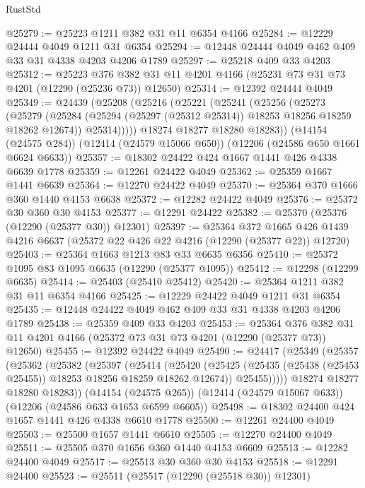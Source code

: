 \begin{lexlean}{RustStd}
\begin{coremodule}
{\begin{coremodule}
{{{{{{{{{{{{{{{{{{{{{{{{{{{{{{{{{{{{{{{{{{{{{{{{{{@25279 := @25223 @1211 @382 @31 @11 @6354 @4166
@25284 := @12229 @24444 @4049 @1211 @31 @6354
@25294 := @12448 @24444 @4049 @462 @409 @33 @31 @4338 @4203 @4206 @1789
@25297 := @25218 @409 @33 @4203
@25312 := @25223
    @376
    @382
    @31
    @11
    @4201
    @4166
    (@25231 @73 @31 @73 @4201 (@12290 (@25236 @73)) @12650)
@25314 := @12392 @24444 @4049
@25349 := @24439
    (@25208
      (@25216
        (@25221
          (@25241
            (@25256
              (@25273
                (@25279
                  (@25284 (@25294 (@25297 (@25312 @25314)) @18253 @18256 @18259 @18262 @12674))
                  @25314)))))
        @18274
        @18277
        @18280
        @18283))
    (@14154 (@24575 @284))
    (@12414 (@24579 @15066 @650))
    (@12206 (@24586 @650 @1661 @6624 @6633))
@25357 := @18302 @24422 @424 @1667 @1441 @426 @4338 @6639 @1778
@25359 := @12261 @24422 @4049
@25362 := @25359 @1667 @1441 @6639
@25364 := @12270 @24422 @4049
@25370 := @25364 @370 @1666 @360 @1440 @4153 @6638
@25372 := @12282 @24422 @4049
@25376 := @25372 @30 @360 @30 @4153
@25377 := @12291 @24422
@25382 := @25370 (@25376 (@12290 (@25377 @30)) @12301)
@25397 := @25364
    @372
    @1665
    @426
    @1439
    @4216
    @6637
    (@25372 @22 @426 @22 @4216 (@12290 (@25377 @22)) @12720)
@25403 := @25364 @1663 @1213 @83 @33 @6635 @6356
@25410 := @25372 @1095 @83 @1095 @6635 (@12290 (@25377 @1095))
@25412 := @12298 (@12299 @6635)
@25414 := @25403 (@25410 @25412)
@25420 := @25364 @1211 @382 @31 @11 @6354 @4166
@25425 := @12229 @24422 @4049 @1211 @31 @6354
@25435 := @12448 @24422 @4049 @462 @409 @33 @31 @4338 @4203 @4206 @1789
@25438 := @25359 @409 @33 @4203
@25453 := @25364
    @376
    @382
    @31
    @11
    @4201
    @4166
    (@25372 @73 @31 @73 @4201 (@12290 (@25377 @73)) @12650)
@25455 := @12392 @24422 @4049
@25490 := @24417
    (@25349
      (@25357
        (@25362
          (@25382
            (@25397
              (@25414
                (@25420
                  (@25425 (@25435 (@25438 (@25453 @25455)) @18253 @18256 @18259 @18262 @12674))
                  @25455)))))
        @18274
        @18277
        @18280
        @18283))
    (@14154 (@24575 @265))
    (@12414 (@24579 @15067 @633))
    (@12206 (@24586 @633 @1653 @6599 @6605))
@25498 := @18302 @24400 @424 @1657 @1441 @426 @4338 @6610 @1778
@25500 := @12261 @24400 @4049
@25503 := @25500 @1657 @1441 @6610
@25505 := @12270 @24400 @4049
@25511 := @25505 @370 @1656 @360 @1440 @4153 @6609
@25513 := @12282 @24400 @4049
@25517 := @25513 @30 @360 @30 @4153
@25518 := @12291 @24400
@25523 := @25511 (@25517 (@12290 (@25518 @30)) @12301)
}}}}}}}}}}}}}}}}}}}}}}}}}}}}}}}}}}}}}}}}}}}}}}}}}}
\end{coremodule}}
\end{coremodule}
\end{lexlean}
